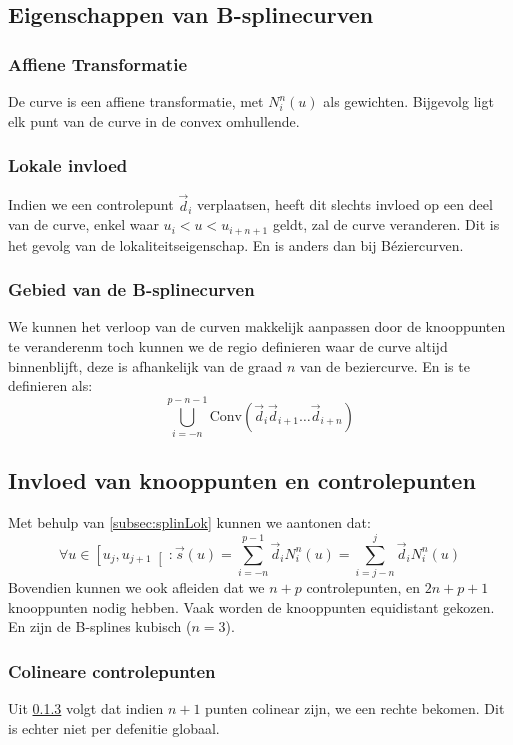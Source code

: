 \documentclass[a4paper,titlepage]{article}
\newcommand{\brak}[1]{\left(#1\right)}
\newcommand{\rinva}[1]{\left[#1\right[}
\newcommand{\splineDef}{\ensuremath{N_i^n\brak{u}} }
\begin{document}
\subsection{Eigenschappen van B-splinecurven}
\subsubsection{Affiene Transformatie}
De curve is een affiene transformatie, met \splineDef als gewichten. Bijgevolg ligt elk punt van de curve in de convex omhullende.
\subsubsection{Lokale invloed}
Indien we een controlepunt $\vec{d}_i$ verplaatsen, heeft dit slechts invloed op een deel van de curve, enkel waar $u_i<u<u_{i+n+1}$ geldt, zal de curve veranderen. Dit is het gevolg van de lokaliteitseigenschap. En is anders dan bij B\'eziercurven.
\subsubsection{Gebied van de B-splinecurven}
\label{subsec:splineConvex}
We kunnen het verloop van de curven makkelijk aanpassen door de knooppunten te veranderenm toch kunnen we de regio definieren waar de curve altijd binnenblijft, deze is afhankelijk van de graad $n$ van de beziercurve. En is te definieren als:
\begin{equation}
\displaystyle\bigcup_{i=-n}^{p-n-1}\mbox{Conv}\left(\vec{d}_i\vec{d}_{i+1}\ldots\vec{d}_{i+n}\right)
\end{equation}
\subsection{Invloed van knooppunten en controlepunten}
\label{subsec:splinLok2}
Met behulp van \ref{subsec:splinLok} kunnen we aantonen dat:
\begin{equation}
\forall u\in\rinva{u_j,u_{j+1}}:\vec{s}\brak{u}=\displaystyle\sum_{i=-n}^{p-1}{\vec{d}_iN_i^n\brak{u}}=\displaystyle\sum_{i=j-n}^{j}{\vec{d}_iN_i^n\brak{u}}
\end{equation}
Bovendien kunnen we ook afleiden dat we $n+p$ controlepunten, en $2n+p+1$ knooppunten nodig hebben. Vaak worden de knooppunten equidistant gekozen. En zijn de B-splines kubisch ($n=3$).
\subsubsection{Colineare controlepunten}
Uit \ref{subsec:splineConvex} volgt dat indien $n+1$ punten colinear zijn, we een rechte bekomen. Dit is echter niet per defenitie globaal.
\end{document}
